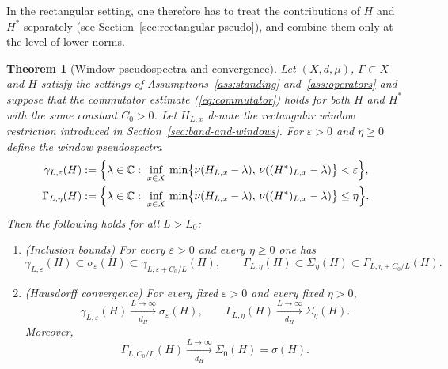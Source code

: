 \documentclass[11pt]{article}
\newtheorem{theorem}{Theorem}
\theoremstyle{definition}
\newcommand{\C}{\mathbb{C}}
\begin{document}
In the rectangular setting, one therefore has to treat the contributions of
$H$ and $H^*$ separately (see Section~\ref{sec:rectangular-pseudo}), and combine
them only at the level of lower norms.

\begin{theorem}[Window pseudospectra and convergence]\label{thm:window-pseudo-convergence}
Let $(X,d,\mu)$, $\Gamma \subset X$ and $H$ satisfy the settings of Assumptions~\ref{ass:standing}
and~\ref{ass:operators} and suppose that the commutator estimate (\ref{eq:commutator}) holds for
both $H$ and $H^*$ with the same constant $C_0>0$.  Let $H_{L,x}$ denote the rectangular window restriction introduced in Section~\ref{sec:band-and-windows}. For $\varepsilon > 0$ and $\eta \ge 0$ define the window
pseudospectra
\begin{align*}
  \gamma_{L,\varepsilon}(H)
  &:= \Bigl\{\lambda\in\C:\;
        \inf_{x\in X}\,
        \min\bigl\{
          \nu(H_{L,x}-\lambda),\,
          \nu((H^*)_{L,x}-\overline{\lambda})
        \bigr\}
        < \varepsilon
      \Bigr\},\\
  \Gamma_{L,\eta}(H)
  &:= \Bigl\{\lambda\in\C:\;
        \inf_{x\in X}\,
        \min\bigl\{
          \nu(H_{L,x}-\lambda),\,
          \nu((H^*)_{L,x}-\overline{\lambda})
        \bigr\}
        \le \eta
      \Bigr\}. 
\end{align*}
Then the following holds for all $L>L_0$:
\begin{enumerate}
\item[(a)] \textup{(Inclusion bounds)} For every $\varepsilon>0$ and every $\eta\ge 0$ one has
\[
  \gamma_{L,\varepsilon}(H)\subset \sigma_\varepsilon(H)\subset
  \gamma_{L,\varepsilon+C_0/L}(H),
  \qquad
  \Gamma_{L,\eta}(H)\subset \Sigma_\eta(H)\subset
  \Gamma_{L,\eta+C_0/L}(H).
\]

\item[(b)] \textup{(Hausdorff convergence)} For every fixed $\varepsilon>0$ and every fixed $\eta>0$,
\[
  \gamma_{L,\varepsilon}(H)\xrightarrow[d_H]{L\to\infty}\sigma_\varepsilon(H),
  \qquad
  \Gamma_{L,\eta}(H)\xrightarrow[d_H]{L\to\infty}\Sigma_\eta(H).
\]
Moreover,
\[
  \Gamma_{L,C_0/L}(H)\xrightarrow[d_H]{L\to\infty}\Sigma_0(H)=\sigma(H).
\]
\end{enumerate}
\end{theorem}
\end{document}
